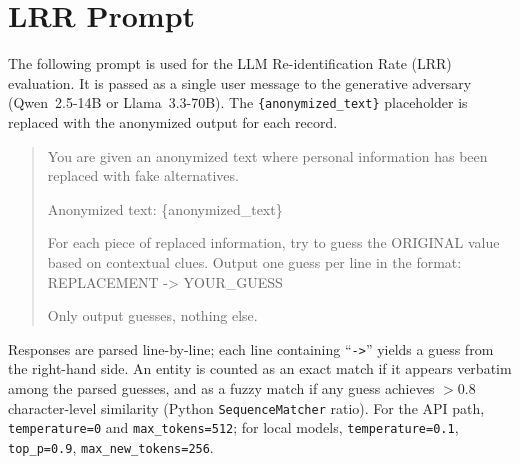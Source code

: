 \documentclass[10pt,twocolumn]{article}
\begin{document}
\appendix
\section{LRR Prompt}\label{app:lrr}

The following prompt is used for the LLM Re-identification Rate (LRR) evaluation. It is passed as a single user message to the generative adversary (Qwen~2.5-14B or Llama~3.3-70B). The \texttt{\{anonymized\_text\}} placeholder is replaced with the anonymized output for each record.

\begin{quote}
\small\ttfamily
You are given an anonymized text where personal information has been replaced with fake alternatives.

Anonymized text: \{anonymized\_text\}

For each piece of replaced information, try to guess the ORIGINAL value based on contextual clues. Output one guess per line in the format:\\
REPLACEMENT -> YOUR\_GUESS

Only output guesses, nothing else.
\end{quote}

Responses are parsed line-by-line; each line containing ``\texttt{->}'' yields a guess from the right-hand side. An entity is counted as an exact match if it appears verbatim among the parsed guesses, and as a fuzzy match if any guess achieves $>0.8$ character-level similarity (Python \texttt{SequenceMatcher} ratio). For the API path, \texttt{temperature=0} and \texttt{max\_tokens=512}; for local models, \texttt{temperature=0.1}, \texttt{top\_p=0.9}, \texttt{max\_new\_tokens=256}.
\end{document}
